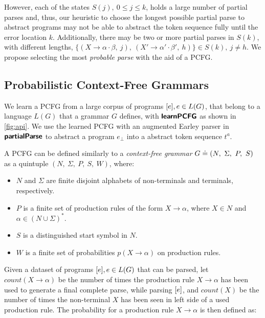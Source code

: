 %
However, each of the states $S(j),\ 0 \leq j \leq k$, holds a large number of
partial parses and, thus, our heuristic to choose the longest possible partial
parse to abstract programs may not be able to abstract the token sequence fully
until the error location $k$. Additionally, there may be two or more partial
parses in $S(k)$, with different lengths, \eg $\{(X \rightarrow \alpha \cdot
\beta,\ j),\ (X' \rightarrow \alpha' \cdot \beta',\ h)\} \in S(k),\ j \neq h$.
We propose selecting the most \emph{probable parse} with the aid of a PCFG.


\subsection{Probabilistic Context-Free Grammars}
\label{sec:prog-abstract:pcfg}
We learn a PCFG from a large corpus of programs $[e], e \in L(G)$, that
belong to a language $L(G)$ that a grammar $G$ defines, with $\bm{\mathsf{learnPCFG}}$ as
shown in \autoref{fig:api}. We use the learned PCFG with an augmented Earley
parser in $\bm{\mathsf{partialParse}}$ to abstract a program $e_{\bot}$ into a abstract token
sequence $t^a$.

%
A PCFG can be defined similarly to a \emph{context-free grammar} $G \doteq (N,\
\Sigma,\ P,\ S)$ as a quintuple $(N,\ \Sigma,\ P,\ S,\ W)$, where:
\begin{itemize}
    \item $N$ and $\Sigma$ are finite disjoint alphabets of non-terminals and
    terminals, respectively.
    \item $P$ is a finite set of production rules of the form $X \rightarrow
    \alpha$, where $X \in N$ and $\alpha \in (N \cup \Sigma)^{\ast}$.
    \item $S$ is a distinguished start symbol in $N$.
    \item $W$ is a finite set of probabilities $p(X \rightarrow \alpha)$ on
    production rules.
\end{itemize}

Given a dataset of programs $[e], e \in L(G)$ that can be parsed, let
$count(X \rightarrow \alpha)$ be the number of times the production rule $X
\rightarrow \alpha$ has been used to generate a final complete parse, while
parsing $[e]$, and $count(X)$ be the number of times the non-terminal $X$
has been seen in left side of a used production rule. The probability for a
production rule $X \rightarrow \alpha$ is then defined as:

